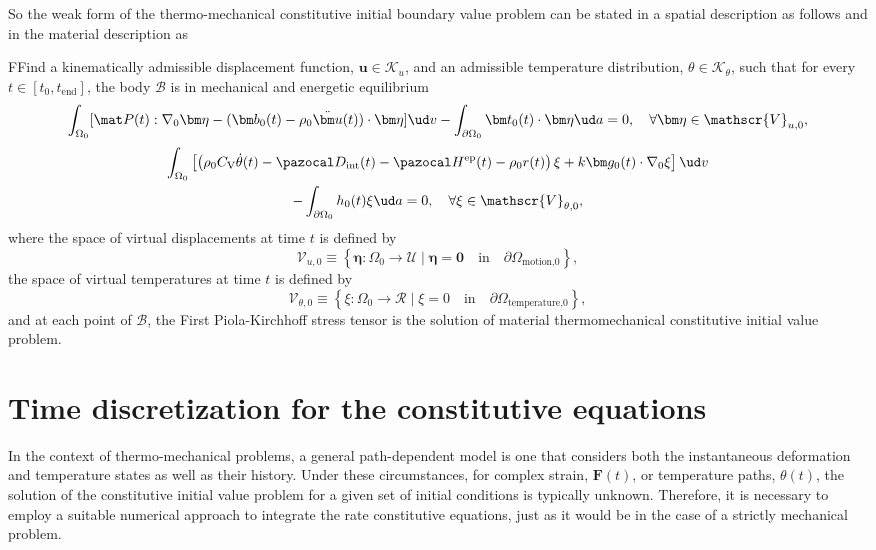 So the weak form of the thermo-mechanical constitutive initial boundary value problem can be stated in a spatial description as follows
and in the material description as
\begin{problem}
    FFind a kinematically admissible displacement function, $\bm u\in \mathscr{K}_u$, and an admissible temperature distribution, \(\theta \in \mathscr K_\theta\), such that for every $t\in [t_0,t_\text{end}]$, the body $\mathscr{B}$ is in mechanical and energetic equilibrium
        \begin{equation}
        \int_{\Omega_0} [\mat P(t):\nabla_0 \bm \eta - (\bm b_0(t)-\rho_0\ddot{\bm u}(t))\cdot \bm \eta]\ud v - \int_{\partial\Omega_0} \bm t_0(t)\cdot \bm \eta\ud a = 0,\quad \forall \bm \eta \in \mathscr{V}_{u,0},
        \end{equation}
        \begin{multline}
        \int_{\Omega_0}   \left[\left(\rho_0C_\mathrm{V}\dot\theta(t) - \pazocal D_\text{int}(t) - \pazocal H^\text{ep}(t) - \rho_0 r(t)\right) \xi + k \bm g_0(t)\cdot \nabla_0 \xi\right]\ud v\\ - \int_{\partial\Omega_0} h_0(t) \xi\ud a = 0,\quad \forall \xi \in \mathscr{V}_{\theta,0},
    \end{multline}
    where the space of virtual displacements at time $t$ is defined by
    \begin{equation}
        \mathscr{V}_{u,0} \equiv \left\{\bm \eta:\Omega_0\to \mathscr{U}\;|\;\bm \eta = \bm 0\quad \text{in}\quad \partial\Omega_\text{motion,0}\right\},
    \end{equation}
    the space of virtual temperatures at time $t$ is defined by
    \begin{equation}
    \mathscr{V}_{\theta,0} \equiv \left\{\xi:\Omega_0\to \mathscr{R}\;|\; \xi =  0\quad \text{in}\quad \partial\Omega_\text{temperature,0}\right\},
    \end{equation}
    and at each point of $\mathscr{B}$, the First Piola-Kirchhoff stress tensor is the solution of material thermomechanical constitutive initial value problem.
\end{problem}

\section{Time discretization for the constitutive equations} \label{sec:time_discretization}

In the context of thermo-mechanical problems, a general path-dependent model is one that considers both the instantaneous deformation and temperature states as well as their history.
Under these circumstances, for complex strain, $\bm F(t)$, or temperature paths, $\theta(t)$, the solution of the constitutive initial value problem for a given set of initial conditions is typically unknown.
Therefore, it is necessary to employ a suitable numerical approach to integrate the rate constitutive equations, just as it would be in the case of a strictly mechanical problem.

